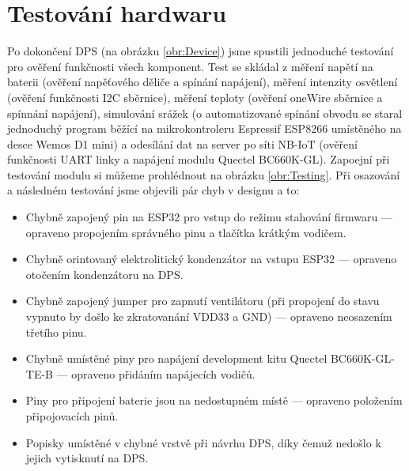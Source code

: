 \section{Testování hardwaru}
\par Po dokončení DPS (na obrázku \ref{obr:Device}) jsme spustili jednoduché testování pro ověření funkčnosti všech komponent. Test se skládal z měření napětí na baterii (ověření napěťového děliče a spínání napájení), měření intenzity osvětlení (ověření funkčnosti I2C sběrnice), měření teploty (ověření oneWire sběrnice a spínnání napájení), simulování srážek (o automatizované spínání obvodu se staral jednoduchý program běžící na mikrokontroleru Espressif ESP8266 umístěného na desce Wemos D1 mini) a odesílání dat na server po síti NB-IoT (ověření funkčnosti UART linky a napájení modulu Quectel BC660K-GL). Zapoejní při testování modulu si můžeme prohlédnout na obrázku \ref{obr:Testing}. Při osazování a následném testování jsme objevili pár chyb v designu a to:
    \begin{itemize}
        \item Chybně zapojený pin na ESP32 pro vstup do režimu stahování firmwaru --- opraveno propojením správného pinu a tlačítka krátkým vodičem.
        \item Chybně orintovaný elektrolitický kondenzátor na vstupu ESP32 --- opraveno otočením kondenzátoru na DPS.
        \item Chybně zapojený jumper pro zapnutí ventilátoru (při propojení do stavu vypnuto by došlo ke zkratovanání VDD33 a GND) --- opraveno neosazením třetího pinu.
        \item Chybně umístěné piny pro napájení development kitu Quectel BC660K-GL-TE-B --- opraveno přidáním napájecích vodičů.
        \item Piny pro připojení baterie jsou na nedostupném místě --- opraveno položením připojovacích pinů.
        \item Popisky umístěné v chybné vrstvě při návrhu DPS, díky čemuž nedošlo k jejich vytisknutí na DPS.
    \end{itemize}


